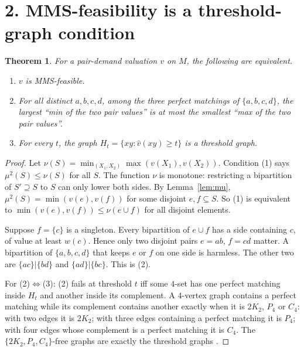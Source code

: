\documentclass[11pt]{article}
\newtheorem{theorem}{Theorem}
\theoremstyle{definition}
\begin{document}
\section*{2. MMS-feasibility is a threshold-graph condition}
\begin{theorem}\label{thm:thr}
For a pair-demand valuation $v$ on $M$, the following are equivalent.
\begin{enumerate}
\item $v$ is MMS-feasible.
\item For all distinct $a,b,c,d$, among the three perfect matchings of $\{a,b,c,d\}$, the largest ``min of the two pair
values'' is at most the smallest ``max of the two pair values''.
\item For every $t$, the graph $H_t=\{xy:\hat v(xy)\ge t\}$ is a threshold graph.
\end{enumerate}
\end{theorem}
\begin{proof}
Let $\nu(S)=\min_{(X_1,X_2)}\max(v(X_1),v(X_2))$. Condition (1) says $\mu^2(S)\le\nu(S)$ for all $S$. The function $\nu$
is monotone: restricting a bipartition of $S'\supseteq S$ to $S$ can only lower both sides. By Lemma~\ref{lem:mu},
$\mu^2(S)=\min(v(e),v(f))$ for some disjoint $e,f\subseteq S$. So (1) is equivalent to
$\min(v(e),v(f))\le\nu(e\cup f)$ for all disjoint elements.

Suppose $f=\{c\}$ is a singleton. Every bipartition of $e\cup f$ has a side containing $c$, of value at least $w(c)$. Hence
only two disjoint pairs $e=ab$, $f=cd$ matter. A bipartition of $\{a,b,c,d\}$ that keeps $e$ or $f$ on one side is
harmless. The other two are $\{ac\}|\{bd\}$ and $\{ad\}|\{bc\}$. This is (2).

For (2)$\Leftrightarrow$(3): (2) fails at threshold $t$ iff some $4$-set has one perfect matching inside $H_t$ and another
inside its complement. A $4$-vertex graph contains a perfect matching while its complement contains another exactly when it
is $2K_2$, $P_4$ or $C_4$: with two edges it is $2K_2$; with three edges containing a perfect matching it is $P_4$; with four
edges whose complement is a perfect matching it is $C_4$. The $\{2K_2,P_4,C_4\}$-free graphs are exactly the threshold
graphs \cite{ch}.
\end{proof}
\end{document}
